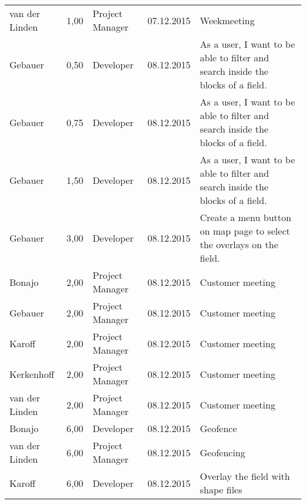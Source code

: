 \begin{longtable}{ l r p{2cm} c p{4cm} }
		van der Linden          & 1,00           & Project Manager & 07.12.2015    & Weekmeeting                                                                     \\
		Gebauer                 & 0,50           & Developer       & 08.12.2015    & As a user, I want to be able to filter and search inside the blocks of a field. \\
		Gebauer                 & 0,75           & Developer       & 08.12.2015    & As a user, I want to be able to filter and search inside the blocks of a field. \\
		Gebauer                 & 1,50           & Developer       & 08.12.2015    & As a user, I want to be able to filter and search inside the blocks of a field. \\
		Gebauer                 & 3,00           & Developer       & 08.12.2015    & Create a menu button on map page to select the overlays on the field.           \\
		Bonajo                  & 2,00           & Project Manager & 08.12.2015    & Customer meeting                                                                 \\
		Gebauer                 & 2,00           & Project Manager & 08.12.2015    & Customer meeting                                                                 \\
		Karoff                  & 2,00           & Project Manager & 08.12.2015    & Customer meeting                                                                 \\
		Kerkenhoff              & 2,00           & Project Manager & 08.12.2015    & Customer meeting                                                                 \\
		van der Linden          & 2,00           & Project Manager & 08.12.2015    & Customer meeting                                                                 \\
		Bonajo                  & 6,00           & Developer       & 08.12.2015    & Geofence                                                                        \\
		van der Linden          & 6,00           & Project Manager & 08.12.2015    & Geofencing                                                                      \\
		Karoff                  & 6,00           & Developer       & 08.12.2015    & Overlay the field with shape files                                              \\

\end{longtable}
